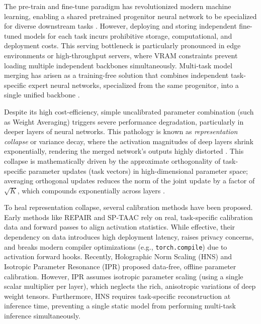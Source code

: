\documentclass{article}
\theoremstyle{plain}
\theoremstyle{definition}
\theoremstyle{remark}
\begin{document}
The pre-train and fine-tune paradigm has revolutionized modern machine learning, enabling a shared pretrained progenitor neural network to be specialized for diverse downstream tasks \citep{bommasani2021opportunities, he2016deep, devlin2018bert}. However, deploying and storing independent fine-tuned models for each task incurs prohibitive storage, computational, and deployment costs. This serving bottleneck is particularly pronounced in edge environments or high-throughput servers, where VRAM constraints prevent loading multiple independent backbones simultaneously. Multi-task model merging has arisen as a training-free solution that combines independent task-specific expert neural networks, specialized from the same progenitor, into a single unified backbone \citep{wortsman2022model, ilharco2022editing}.

Despite its high cost-efficiency, simple uncalibrated parameter combination (such as Weight Averaging) triggers severe performance degradation, particularly in deeper layers of neural networks. This pathology is known as \emph{representation collapse} or variance decay, where the activation magnitudes of deep layers shrink exponentially, rendering the merged network's outputs highly distorted \citep{jordan2023repair, leclaire2024isotropic}. This collapse is mathematically driven by the approximate orthogonality of task-specific parameter updates (task vectors) in high-dimensional parameter space; averaging orthogonal updates reduces the norm of the joint update by a factor of $\sqrt{K}$, which compounds exponentially across layers \citep{leclaire2024isotropic, visionary2026holographic}.

To heal representation collapse, several calibration methods have been proposed. Early methods like REPAIR \citep{jordan2023repair} and SP-TAAC \citep{leclaire2024isotropic} rely on real, task-specific calibration data and forward passes to align activation statistics. While effective, their dependency on data introduces high deployment latency, raises privacy concerns, and breaks modern compiler optimizations (e.g., \texttt{torch.compile}) due to activation forward hooks. Recently, Holographic Norm Scaling (HNS) \citep{visionary2026holographic} and Isotropic Parameter Resonance (IPR) \citep{leclaire2024isotropic} proposed data-free, offline parameter calibration. However, IPR assumes isotropic parameter scaling (using a single scalar multiplier per layer), which neglects the rich, anisotropic variations of deep weight tensors. Furthermore, HNS requires task-specific reconstruction at inference time, preventing a single static model from performing multi-task inference simultaneously.
\end{document}
